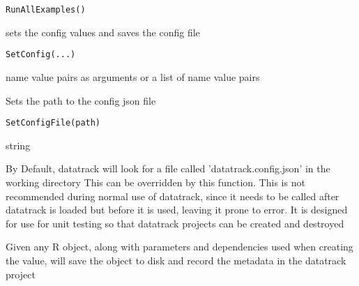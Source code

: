 \documentclass[a4paper]{book}
\begin{document}
%
\begin{Usage}
\begin{verbatim}
RunAllExamples()
\end{verbatim}
\end{Usage}
%
\begin{Description}\relax
sets the config values and saves the config file
\end{Description}
%
\begin{Usage}
\begin{verbatim}
SetConfig(...)
\end{verbatim}
\end{Usage}
%
\begin{Arguments}
\begin{ldescription}
\item[\code{...}] name value pairs as arguments or a list of name value pairs
\end{ldescription}
\end{Arguments}
%
\begin{Description}\relax
Sets the path to the config json file
\end{Description}
%
\begin{Usage}
\begin{verbatim}
SetConfigFile(path)
\end{verbatim}
\end{Usage}
%
\begin{Arguments}
\begin{ldescription}
\item[\code{path}] string
\end{ldescription}
\end{Arguments}
%
\begin{Details}\relax
By Default, datatrack will look for a file called 'datatrack.config.json' in the working directory
This can be overridden by this function. This is not recommended during normal use of datatrack,
since it needs to be called after datatrack is loaded but before it is used, leaving it prone to error.
It is designed for use for unit testing so that datatrack projects can be created and destroyed
\end{Details}
%
\begin{Description}\relax
Given any R object, along with parameters and dependencies used when creating the value, will
save the object to disk and record the metadata in the datatrack project
\end{Description}
\end{document}
